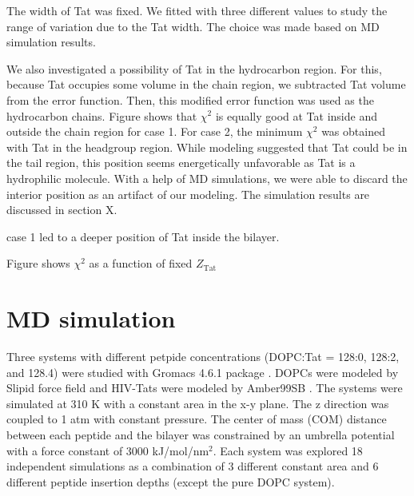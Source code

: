 \documentclass[12pt,letterpaper]{article}
\newcommand{\ztat}{Z_\mathrm{Tat}}
\begin{document}
The width of Tat was fixed. We fitted with three different values to study
the range of variation due to the Tat width. The choice was made based on
MD simulation results.

We also investigated a possibility of Tat in the hydrocarbon region. For this,
because Tat occupies some volume in the chain region, we subtracted Tat
volume from the error function. Then, this modified error function was used
as the hydrocarbon chains. Figure shows that $\chi^2$ is equally good at 
Tat inside and outside the chain region for case 1. For case 2, the minimum
$\chi^2$ was obtained with Tat in the headgroup region. While modeling suggested
that Tat could be in the tail region, this position seems energetically 
unfavorable as Tat is a hydrophilic molecule. With a help of MD simulations,
we were able to discard the interior position as an artifact of our 
modeling. The simulation results are discussed in section X.

case 1 led to a deeper position of Tat inside the bilayer.

Figure shows $\chi^2$ as a function of fixed $\ztat$

\section{MD simulation}
Three systems with different petpide concentrations (DOPC:Tat = 128:0, 128:2, and 128.4)
were studied with Gromacs 4.6.1 package \cite{ref:Hess08}. DOPCs were modeled by Slipid 
force field \cite{ref:Jambeck12_JPCB,ref:Jambeck12_JCTC} and HIV-Tats
were modeled by Amber99SB \cite{ref:Hornak06}. The systems were simulated at 
310 K with a constant
area in the x-y plane. The z direction was coupled to 1 atm with constant pressure. The
center of mass (COM) distance between each peptide and the bilayer was constrained by an
umbrella potential with a force constant of 3000 kJ/mol/nm$^2$. Each system was explored
18 independent simulations as a combination of 3 different constant area and 6 different
peptide insertion depths (except the pure DOPC system).
\end{document}
